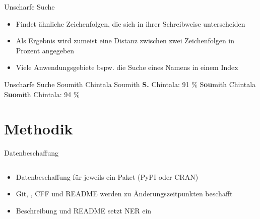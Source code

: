 \documentclass[%
    handout,
    aspectratio=1610,
    10pt,
    onlytextwidth, %
]{beamer}
\def\\{}%
\begin{document}

\begin{frame}{Unscharfe Suche}
    \begin{itemize}
        \item Findet ähnliche Zeichenfolgen, die sich in ihrer Schreibweise unterscheiden
        \item Als Ergebnis wird zumeist eine Distanz zwischen zwei Zeichenfolgen in Prozent angegeben
        \item Viele Anwendungsgebiete bspw. die Suche eines Namens in einem Index
    \end{itemize}
    \begin{exampleblock}{Unscharfe Suche}
        Soumith Chintala \leftrightarrow{} Soumith \textbf{S.} Chintala: 91 \% \\
        S\textbf{ou}mith Chintala \leftrightarrow{} S\textbf{uo}mith Chintala: 94 \%
    \end{exampleblock}
\end{frame}

\section{Methodik}

\begin{frame}{Datenbeschaffung}
    \begin{columns}
        \begin{column}[t]{0.39\textwidth}
            \begin{itemize}
                \item Datenbeschaffung für jeweils ein Paket (PyPI oder CRAN)
                \item Git, , CFF und README werden zu Änderungszeitpunkten beschafft
                \item Beschreibung und README setzt NER ein
            \end{itemize}
        \end{column}
        \begin{column}[t]{0.59\textwidth}
            \begin{center}
                
            \end{center}
        \end{column}
    \end{columns}
\end{frame}
\end{document}
